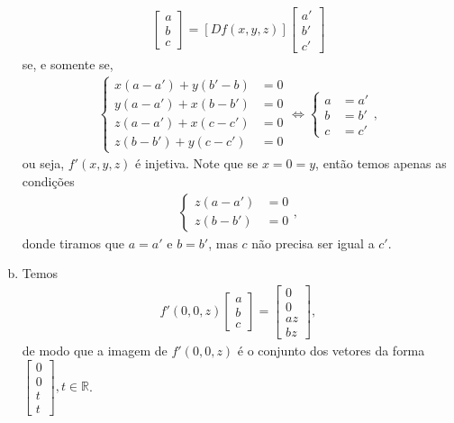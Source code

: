 \documentclass[12pt,a4paper]{article}
\begin{document}
\begin{enumerate}[a)]
\begin{align*}
            [Df(x,y,z)]\begin{bmatrix} a \\ b \\ c \end{bmatrix} 
            = [Df(x,y,z)]\begin{bmatrix} a' \\ b' \\ c' \end{bmatrix}
        \end{align*}
        se, e somente se,
        \begin{align*}
            \begin{cases}
                x(a-a') + y(b'-b) &= 0 \\
                y(a-a') + x(b-b') &= 0 \\
                z(a-a') + x(c-c') &= 0 \\
                z(b-b') + y(c-c') &= 0
            \end{cases}
            \iff 
            \begin{cases}
                a &= a' \\
                b &= b' \\
                c &= c'
            \end{cases},
        \end{align*}
        ou seja, $f'(x,y,z)$ é injetiva. Note que se $x=0=y$, então temos apenas as condições
        \begin{align*}
            \begin{cases}
                z(a-a') &= 0 \\
                z(b-b') &= 0
            \end{cases},
        \end{align*}
        donde tiramos que $a = a'$ e $b = b'$, mas $c$ não precisa ser igual a $c'$.
        \item Temos
        \begin{align*}
            f'(0,0,z)\begin{bmatrix} a \\ b \\ c \end{bmatrix} = \begin{bmatrix} 0 \\ 0 \\ az \\ bz \end{bmatrix},
        \end{align*}
        de modo que a imagem de $f'(0,0,z)$ é o conjunto dos vetores da forma 
        $\displaystyle{ \begin{bmatrix} 0 \\ 0 \\ t \\ t \end{bmatrix}, t\in\mathbb{R} }$.
    \end{enumerate}
%
\end{document}

